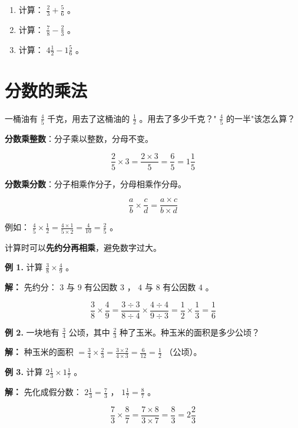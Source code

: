 \begin{practice}


\begin{enumerate}
  \item 计算： $\frac{2}{3} + \frac{5}{6}$ 。
  \item 计算： $\frac{7}{8} - \frac{2}{3}$ 。
  \item 计算： $4\frac{1}{2} - 1\frac{5}{6}$ 。
\end{enumerate}


\end{practice}

\section*{分数的乘法}


\begin{explore}


一桶油有 $\frac{4}{5}$ 千克，用去了这桶油的 $\frac{1}{2}$ 。用去了多少千克？" $\frac{4}{5}$ 的一半"该怎么算？

\end{explore}

\begin{understand}


\textbf{分数乘整数}：分子乘以整数，分母不变。

\[
\frac{2}{5} \times 3 = \frac{2 \times 3}{5} = \frac{6}{5} = 1\frac{1}{5}
\]


\textbf{分数乘分数}：分子相乘作分子，分母相乘作分母。

\[
\frac{a}{b} \times \frac{c}{d} = \frac{a \times c}{b \times d}
\]


例如： $\frac{4}{5} \times \frac{1}{2} = \frac{4 \times 1}{5 \times 2} = \frac{4}{10} = \frac{2}{5}$ 。

计算时可以\textbf{先约分再相乘}，避免数字过大。

\end{understand}

\begin{workedexamples}


\textbf{例 1.} 计算 $\frac{3}{8} \times \frac{4}{9}$ 。

\textbf{解：} 先约分： $3$ 与 $9$ 有公因数 $3$ ， $4$ 与 $8$ 有公因数 $4$ 。

\[
\frac{3}{8} \times \frac{4}{9} = \frac{3 \div 3}{8 \div 4} \times \frac{4 \div 4}{9 \div 3} = \frac{1}{2} \times \frac{1}{3} = \frac{1}{6}
\]


\textbf{例 2.} 一块地有 $\frac{3}{4}$ 公顷，其中 $\frac{2}{3}$ 种了玉米。种玉米的面积是多少公顷？

\textbf{解：} 种玉米的面积 $= \frac{3}{4} \times \frac{2}{3} = \frac{3 \times 2}{4 \times 3} = \frac{6}{12} = \frac{1}{2}$ （公顷）。

\textbf{例 3.} 计算 $2\frac{1}{3} \times 1\frac{1}{7}$ 。

\textbf{解：} 先化成假分数： $2\frac{1}{3} = \frac{7}{3}$ ， $1\frac{1}{7} = \frac{8}{7}$ 。

\[
\frac{7}{3} \times \frac{8}{7} = \frac{7 \times 8}{3 \times 7} = \frac{8}{3} = 2\frac{2}{3}
\]


\end{workedexamples}

